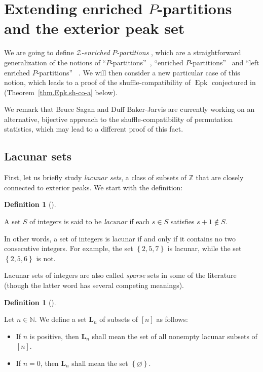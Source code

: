 \documentclass[numbers=enddot,12pt,final,onecolumn,notitlepage]{scrartcl}%
\theoremstyle{definition}
\newtheorem{defi}[theo]{Definition}
\newenvironment{definition}[1][]
{\begin{defi}[#1]\begin{leftbar}}
{\end{leftbar}\end{defi}}
\begin{document}
\section{\label{sect.Zenri}Extending enriched $P$-partitions and the exterior
peak set}

We are going to define \textit{$\mathcal{Z}$-enriched }$P$\textit{-partitions}%
, which are a straightforward generalization of the notions of
\textquotedblleft$P$-partitions\textquotedblright\ \cite{Stanle72},
\textquotedblleft enriched $P$-partitions\textquotedblright\ \cite[\S 2]{Stembr97}
and \textquotedblleft left enriched $P$-partitions\textquotedblright
\ \cite{Peters05}. We will then consider a new particular case
of this notion, which leads to a proof of the shuffle-compatibility of
$\operatorname*{Epk}$ conjectured in \cite{part1}
(Theorem~\ref{thm.Epk.sh-co-a} below).

We remark that Bruce Sagan and Duff Baker-Jarvis are currently working on an
alternative, bijective approach to the shuffle-compatibility of permutation
statistics, which may lead to a different proof of this fact.

\subsection{Lacunar sets}

First, let us briefly study \textit{lacunar sets}, a class of subsets
of $\mathbb{Z}$ that are closely connected to exterior peaks.
We start with the definition:

\begin{definition}
A set $S$ of integers is said to be \textit{lacunar} if each $s\in S$
satisfies $s+1\notin S$.
\end{definition}

In other words, a set of integers is lacunar if and only if it contains no two
consecutive integers. For example, the set $\left\{  2, 5, 7\right\}  $ is
lacunar, while the set $\left\{  2, 5, 6\right\}  $ is not.

Lacunar sets of integers are also called \textit{sparse} sets in some of the
literature (though the latter word has several competing meanings).

\begin{definition}
\label{def.lac.Ln}
Let $n\in\mathbb{N}$. We define a set $\mathbf{L}_{n}$ of subsets of $\left[
n\right]  $ as follows:

\begin{itemize}
\item If $n$ is positive, then $\mathbf{L}_{n}$ shall mean the set of all
nonempty lacunar subsets of $\left[  n\right]  $.

\item If $n=0$, then $\mathbf{L}_{n}$ shall mean the set $\left\{
\varnothing\right\}  $.
\end{itemize}
\end{definition}
\end{document}

